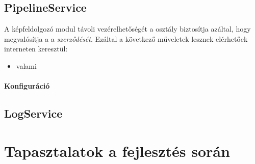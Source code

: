 \subsection{PipelineService}

A képfeldolgozó modul távoli vezérelhetőségét a  osztály biztosítja azáltal, hogy megvalósítja a a  \textit{szerződését}. Ezáltal a következő műveletek lesznek elérhetőek interneten keresztül:
\begin{itemize}
\item valami
\end{itemize}


\paragraph{Konfiguráció}

\subsection{LogService} 

\section{Tapasztalatok a fejlesztés során}

